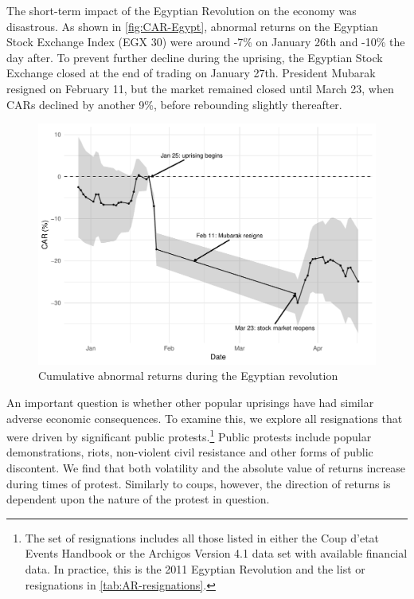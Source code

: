 \documentclass[12pt,final,fleqn]{article}
\theoremstyle{plain}
\begin{document}
The short-term impact of the Egyptian Revolution on the economy was disastrous. As shown in \autoref{fig:CAR-Egypt}, abnormal returns on the Egyptian Stock Exchange Index (EGX 30) were around -7\% on January 26th and -10\% the day after. To prevent further decline during the uprising, the Egyptian Stock Exchange closed at the end of trading on January 27th. President Mubarak resigned on February 11, but the market remained closed until March 23, when CARs declined by another 9\%, before rebounding slightly thereafter.

\begin{figure}[!ht]
\includegraphics{../figs/egypt-revolution-2011.pdf}
\caption{Cumulative abnormal returns during the Egyptian revolution}
\label{fig:CAR-Egypt}
\end{figure}

An important question is whether other popular uprisings have had similar adverse economic consequences. To examine this, we explore all resignations that were driven by significant public protests.\footnote{The set of resignations includes all those listed in either the Coup d'etat Events Handbook or the Archigos Version 4.1 data set with available financial data. In practice, this is the 2011 Egyptian Revolution and the list or resignations in \autoref{tab:AR-resignations}.} Public protests include popular demonstrations, riots, non-violent civil resistance and other forms of public discontent. We find that both volatility and the absolute value of returns increase during times of protest. Similarly to coups, however, the direction of returns is dependent upon the nature of the protest in question. 
\end{document}
